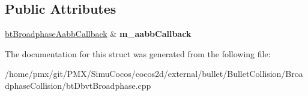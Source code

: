 \subsection*{Public Attributes}
\begin{DoxyCompactItemize}
\item 
\mbox{\label{structBroadphaseAabbTester_a97d64cd751729e44a3420d29201e71ba}} 
\hyperlink{structbtBroadphaseAabbCallback}{bt\+Broadphase\+Aabb\+Callback} \& {\bfseries m\+\_\+aabb\+Callback}
\end{DoxyCompactItemize}


The documentation for this struct was generated from the following file\+:\begin{DoxyCompactItemize}
\item 
/home/pmx/git/\+P\+M\+X/\+Simu\+Cocos/cocos2d/external/bullet/\+Bullet\+Collision/\+Broadphase\+Collision/bt\+Dbvt\+Broadphase.\+cpp\end{DoxyCompactItemize}

